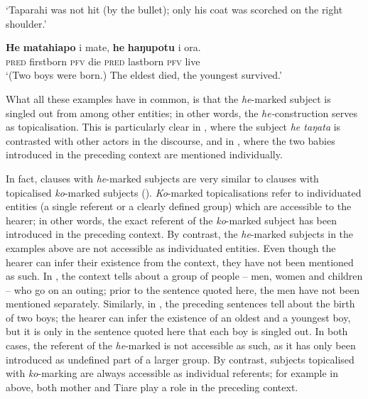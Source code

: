 \glt 
‘Taparahi was not hit (by the bullet); only his coat was scorched on the right shoulder.’ 

\z

\ea\label{ex:8.95}
\gll \textbf{He} \textbf{matahiapo} i mate, \textbf{he} \textbf{haŋupotu} i ora. \\
\textsc{pred} firstborn \textsc{pfv} die \textsc{pred} lastborn \textsc{pfv} live \\

\glt
‘(Two boys were born.) The eldest died, the youngest survived.’ \textstyleExampleref{[Fel-1978.121]}
\z

What all these examples have in common, is that the \textit{he}{}-marked subject is singled out from among other entities; in other words, the \textit{he-}construction serves as topicalisation. This is particularly clear in , where the subject \textit{he taŋata} is contrasted with other actors in the discourse, and in , where the two babies introduced in the preceding context are mentioned individually. 

In fact, clauses with \textit{he}{}-marked subjects are very similar to clauses with topicalised \textit{ko}{}-marked subjects (). \textit{Ko}{}-marked topicalisations refer to individuated entities (a single referent or a clearly defined group) which are accessible to the hearer; in other words, the exact referent of the \textit{ko}{}-marked subject has been introduced in the preceding context. By contrast, the \textit{he}{}-marked subjects in the examples above are not accessible as individuated entities. Even though the hearer can infer their existence from the context, they have not been mentioned as such. In , the context tells about a group of people – men, women and children – who go on an outing; prior to the sentence quoted here, the men have not been mentioned separately. Similarly, in , the preceding sentences tell about the birth of two boys; the hearer can infer the existence of an oldest and a youngest boy, but it is only in the sentence quoted here that each boy is singled out. In both cases, the referent of the \textit{he}{}-marked  is not accessible as such, as it has only been introduced as undefined part of a larger group. By contrast, subjects topicalised with \textit{ko}{}-marking are always accessible as individual referents; for example in  above, both mother and Tiare play a role in the preceding context.

